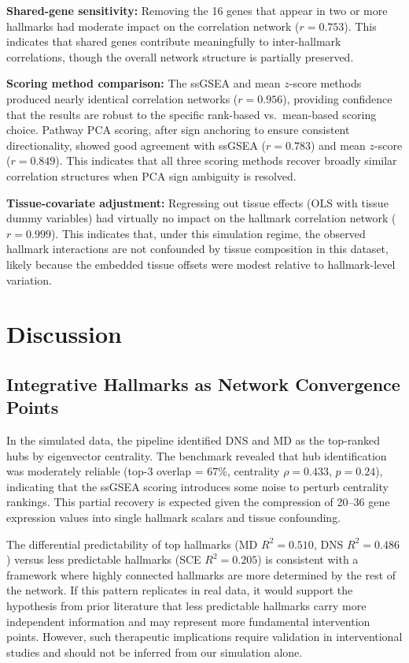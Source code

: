 \documentclass[11pt,a4paper]{article}
\begin{document}
\textbf{Shared-gene sensitivity:} Removing the 16 genes that appear in two or more hallmarks had moderate impact on the correlation network ($r = 0.753$). This indicates that shared genes contribute meaningfully to inter-hallmark correlations, though the overall network structure is partially preserved.

\textbf{Scoring method comparison:} The ssGSEA and mean $z$-score methods produced nearly identical correlation networks ($r = 0.956$), providing confidence that the results are robust to the specific rank-based vs.\ mean-based scoring choice. Pathway PCA scoring, after sign anchoring to ensure consistent directionality, showed good agreement with ssGSEA ($r = 0.783$) and mean $z$-score ($r = 0.849$). This indicates that all three scoring methods recover broadly similar correlation structures when PCA sign ambiguity is resolved.

\textbf{Tissue-covariate adjustment:} Regressing out tissue effects (OLS with tissue dummy variables) had virtually no impact on the hallmark correlation network ($r = 0.999$). This indicates that, under this simulation regime, the observed hallmark interactions are not confounded by tissue composition in this dataset, likely because the embedded tissue offsets were modest relative to hallmark-level variation.

\section{Discussion}

\subsection{Integrative Hallmarks as Network Convergence Points}

In the simulated data, the pipeline identified DNS and MD as the top-ranked hubs by eigenvector centrality. The benchmark revealed that hub identification was moderately reliable (top-3 overlap = 67\%, centrality $\rho = 0.433$, $p = 0.24$), indicating that the ssGSEA scoring introduces some noise to perturb centrality rankings. This partial recovery is expected given the compression of 20--36 gene expression values into single hallmark scalars and tissue confounding.

The differential predictability of top hallmarks (MD $R^2 = 0.510$, DNS $R^2 = 0.486$) versus less predictable hallmarks (SCE $R^2 = 0.205$) is consistent with a framework where highly connected hallmarks are more determined by the rest of the network. If this pattern replicates in real data, it would support the hypothesis from prior literature \citep{kennedy2014geroscience} that less predictable hallmarks carry more independent information and may represent more fundamental intervention points. However, such therapeutic implications require validation in interventional studies and should not be inferred from our simulation alone.
\end{document}

